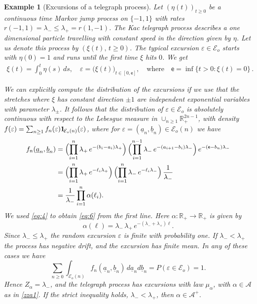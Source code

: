 \documentclass[12pt]{article}
\numberwithin{equation}{section}
\newtheorem{example}[theorem]{Example}
\newcommand{\RR}{\mathbb R}
\newcommand{\cE}{\mathcal E}
\newcommand{\se}{{\mathsf{e}}}
\newcommand{\ua}{\underline a}
\newcommand{\ub}{\underline b}
\newcommand{\one}{{\bf 1}\hskip-.5mm} %
\newcommand{\vep}{\varepsilon}
\begin{document}
\begin{example}
  [Excursions of a telegraph process]\label{teleg}\rm
Let $(\eta(t))_{t\ge0}$ be a continuous time Markov jump process on $\{-1, 1\}$ 
with rates $r(-1, 1)=\lambda_-\le \lambda_+=r(1, -1)$. The Kac telegraph process \cite{zbMATH03491985} describes a one dimensional particle travelling with constant speed in the direction given by $\eta$. Let us denote this process by $(\xi(t),\,t\ge 0)$. The typical excursion $\vep\in\cE_o$ starts with $\eta(0)=1$ and runs until the first time $\xi$ hits $0$. We get
\begin{align}
	\xi(t)=\int_0^t \eta(s)\, ds,\quad
	\vep =\bigl(\xi(t)\bigr)_{t\in[0, \se]}, \quad \text{where} \quad \se = \inf\{t>0: \xi(t)=0\}\,.\label{6}
\end{align}

We can explicitly compute the distribution of the excursions if we use that the stretches where $\xi$ has constant direction $\pm 1$ are independent exponential variables with parameter $\lambda_{\pm}$. It follows that the distribution of $\vep\in\cE_o$ is absolutely continuous with respect to the Lebesgue measure in $\cup_{n\ge1}\RR^{2n-1}_+$, with density $f(\vep)=\sum_{n\ge1}f_n(\vep)\one_{\cE_o(n)}(\vep)$, where for $\vep=(\ua_n,\ub_n)\in\cE_o(n)$ we have
\begin{align}
  f_n(\ua_n,\ub_n)
  &=
    \Bigl(\prod_{i=1}^n \lambda_+\,e^{ -(b_i-a_i)\lambda_+}\Bigr)\,
    \Bigl(\prod_{i=1}^{n-1} \lambda_-\,e^{-(a_{i+1}-b_i)\lambda_-}\Bigr)\,
    e^{ - (\se-b_n)\lambda_-} \\
  &= \Bigl(\prod_{i=1}^n \lambda_+\,e^{-\ell_i\lambda_+} \Bigr)\,
    \Bigl(\prod_{i=1}^{n} \lambda_-\,e^{-\ell_i\lambda_-}\Bigr)\,\frac{1}{\lambda_-}
  \label{eq:6}\\
&=  \frac{1}{\lambda_-} \prod_{i=1}^n \alpha(\ell_i).
\end{align}
We used \eqref{eq:4} to obtain \eqref{eq:6} from the first line. Here $\alpha:\RR_+\to \RR_+$ is given by
\begin{equation}\label{zza1}
	\alpha(\ell)=\lambda_-\, \lambda_+\, e^{-\left(\lambda_-+\lambda_+\right)\ell}.
\end{equation}
Since $\lambda_-\le \lambda_+$ the random excursion $\vep$ is finite with probability one. If $\lambda_- < \lambda_+$ the process has  negative drift, and the excursion has finite mean. In any of these cases we have
\[
  \sum_{n\ge0}\int_{\cE_o(n)}f_n(\ua_n,\ub_n)\, d\ua_nd\ub_n =P(\vep\in\cE_o)=1.
\]
Hence $Z_\alpha = \lambda_-$,
and the telegraph process has excursions with
law $\mu_\alpha$, with $\alpha \in \mathcal A$ as in \eqref{zza1}. If the strict inequality holds, $\lambda_-<\lambda_+$, then $\alpha \in \mathcal A^+$.


\end{example}
\end{document}
